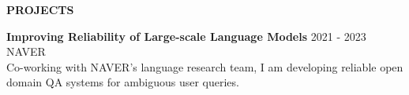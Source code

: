 \documentclass[12pt]{article}
\begin{document}











\begin{center}
	{\noindent \bfseries PROJECTS}
    \noindent\makebox[\linewidth]{\rule{0.75\paperwidth}{0.4pt}}
\end{center}

\noindent
{\bfseries Improving Reliability of Large-scale Language Models} \hfill 2021 - 2023 \\ 
\noindent 
NAVER \\
Co-working with NAVER's language research team, I am developing reliable open domain QA systems for ambiguous user queries.
\\ 
\end{document}
